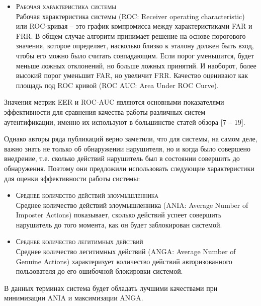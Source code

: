 \documentclass[12pt]{article}
\begin{document}
    \begin{itemize}
        \item \textsc{Рабочая характеристика системы} \\
        Рабочая характеристика системы (ROC: Receiver operating characteristic) или ROC-кривая -- это график компромисса между характеристиками FAR и FRR. В общем случае алгоритм принимает решение на основе порогового значения, которое определяет, насколько близко к эталону должен быть вход, чтобы его можно было считать совпадающим. Если порог уменьшится, будет меньше ложных отклонений, но больше ложных принятий. И наоборот, более высокий порог уменьшит FAR, но увеличит FRR. Качество оценивают как площадь под ROC кривой (ROC AUC: Area Under ROC Curve).
    \end{itemize}

    \par Значения метрик EER и ROC-AUC являются основными показателями эффективности для сравнения качества работы различных систем аутентификации, именно их используют в большинстве статей обзора [7 -- 19].

    \par Однако авторы ряда публикаций \cite{Mondal, Mondal_2, Mondal_3} верно заметили, что для системы, на самом деле, важно знать не только об обнаружении нарушителя, но и когда было совершено внедрение, т.е. сколько действий нарушитель был в состоянии совершить до обнаружения. Поэтому они предложили использовать следующие характеристики для оценки эффективности работы системы:

    \begin{itemize}
        \item \textsc{Среднее количество действий злоумышленника} \\
        Среднее количество действий злоумышленника (ANIA: Average Number of Imposter Actions) показывает, сколько действий успеет совершить нарушитель до того момента, как он будет заблокирован системой.
        \item \textsc{Среднее количество легитимных действий} \\
        Среднее количество легитимных действий (ANGA: Average Number of Genuine Actions) характеризует количество действий авторизованного пользователя до его ошибочной блокировки системой.
    \end{itemize}

    \par В данных терминах система будет обладать лучшими качествами при минимизации ANIA и максимизации ANGA.
\end{document}
